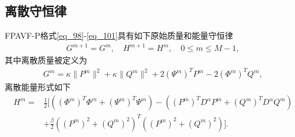 \subsection{离散守恒律}
\begin{thm}\label{thm4}
	FPAVF-P格式\eqref{eq_98}-\eqref{eq_101}具有如下原始质量和能量守恒律
\begin{align}\label{eq_11141}
G^{m+1}=G^{m}, \quad H^{m+1}=H^{m}, \quad 0 \leq m \leq M-1,
\end{align}
其中离散质量被定义为
\begin{align}\label{eq_11142}
G^{m}=\kappa\|P^{m}\|^2+\kappa\|Q^{m}\|^2+2 \left(\Psi^{m}\right)^T P^{m}-2 \left(\varPhi^{m}\right)^T Q^{m},
\end{align}
离散能量形式如下
\begin{align}
H^{m}=&\frac{1}{2}[((\varPhi^{m})^{T}\varPhi^{m}+(\Psi^{m})^{T}\Psi^{m})-((P^{m})^{T} D^{\alpha} P^{m}+(Q^{m})^{T} D^{\alpha} Q^{m})\nonumber\\
&+\frac{\beta}{2}((P^{m})^2+(Q^{m})^2)^{T}((P^{m})^2+(Q^{m})^2)].\label{eq_800}
\end{align}
\end{thm}

